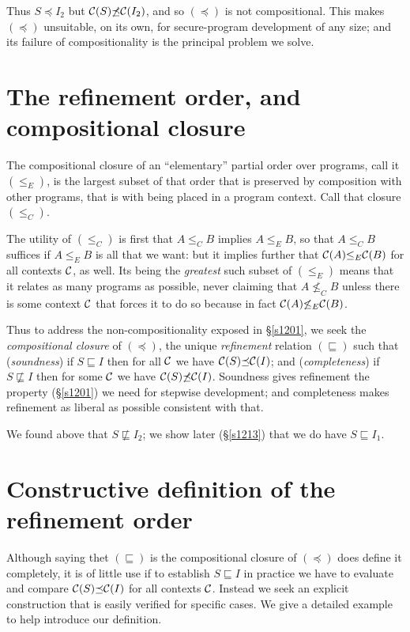 \documentclass[runningheads]{llncs}
\newcommand\Sec[1] {Sec.~\ref{#1}}
\renewcommand\Sec[1] {\S\ref{#1}}
\newcommand\CC {{\cal C}}
\newcommand\Ref {\mathrel{\sqsubseteq}}
\newcommand\NotRef {\mathrel{\not\sqsubseteq}}
\newcommand\ERef {\mathrel{\preceq}}
\newcommand\NotERef {\mathrel{\not\preceq}}
\begin{document}
Thus $S{\ERef}I_2$ but $\CC(S){\NotERef}\CC(I_2)$, and so $(\ERef)$ is not compositional. This makes $(\ERef)$ unsuitable, on its own, for secure-program development of any size; and its failure of compositionality is the principal problem we solve.

\section{The refinement order, and compositional closure}
The compositional closure of an ``elementary'' partial order over programs, call it $(\leq_E)$, is the largest subset of that order that is preserved by composition with other programs, that is with being placed in a program context. Call that closure $(\leq_C)$.

The utility of $(\leq_C)$ is first that $A{\leq_C}B$ implies $A{\leq_E}B$, so that $A{\leq_C}B$ suffices if $A{\leq_E}B$ is all that we want: but it implies further that $\CC(A){\leq_E}\CC(B)$ for all contexts $\CC$, as well. Its being the \emph{greatest} such subset of $(\leq_E)$ means that it relates as many programs as possible, never claiming that $A{\not\leq_C}B$ unless there is some context $\CC$ that forces it to do so because in fact $\CC(A){\not\leq_E}\CC(B)$.

Thus to address the non-compositionality exposed in \Sec{s1201}, we seek the \emph{compositional closure} of $(\ERef)$, the unique \emph{refinement} relation $(\Ref)$ such that (\emph{soundness}) if $S{\Ref}I$ then for all $\CC$ we have $\CC(S){\ERef}\CC(I)$; and (\emph{completeness}) if $S{\NotRef}I$ then for some $\CC$ we have $\CC(S){\NotERef}\CC(I)$. Soundness gives refinement the property (\Sec{s1201}) we need for stepwise development; and completeness makes refinement as liberal as possible consistent with that.

We found above that $S{\NotRef}I_2$; we show later (\Sec{s1213}) that we do have $S{\Ref}I_1$.

\section{Constructive definition of the refinement order}\label{s1457}

Although saying thet $(\Ref)$ is the compositional closure of $(\ERef)$ does define it completely, it is of little use if to establish $S{\Ref}I$ in practice we have to evaluate and compare $\CC(S){\ERef}\CC(I)$ for all contexts $\CC$. Instead we seek an explicit construction that is easily verified for specific cases. We give a detailed example to help introduce our definition.
\end{document}
